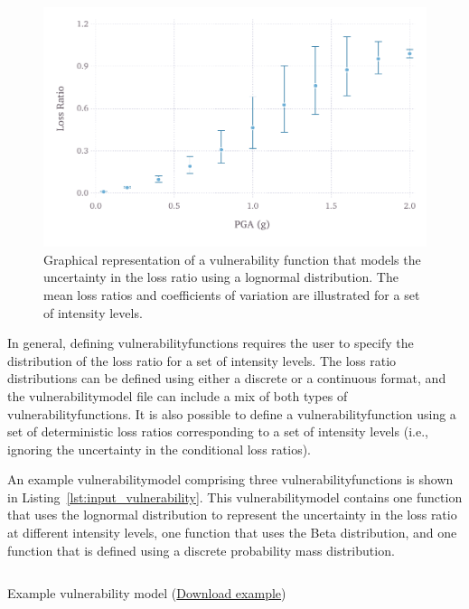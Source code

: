 \begin{figure}[ht]
\centering
\includegraphics[width=12cm]{figures/risk/vulnerability-nonzero-cov.pdf}
\caption{Graphical representation of a vulnerability function that models the uncertainty in the loss ratio using a lognormal distribution. The mean loss ratios and coefficients of variation are illustrated for a set of intensity levels.}
\label{fig:vulnerability-nonzero-cov}
\end{figure}

In general, defining \glspl{vulnerabilityfunction} requires the user to
specify the distribution of the loss ratio for a set of intensity levels. The
loss ratio distributions can be defined using either a discrete or a
continuous format, and the \gls{vulnerabilitymodel} file can include a mix of
both types of \glspl{vulnerabilityfunction}. It is also possible to define a
\gls{vulnerabilityfunction} using a set of deterministic loss ratios
corresponding to a set of intensity levels (i.e., ignoring the uncertainty in
the conditional loss ratios).

An example \gls{vulnerabilitymodel} comprising three
\glspl{vulnerabilityfunction} is shown in
Listing~\ref{lst:input_vulnerability}. This \gls{vulnerabilitymodel} contains
one function that uses the lognormal distribution to represent the uncertainty
in the loss ratio at different intensity levels, one function that uses the
Beta distribution, and one function that is defined using a discrete
probability mass distribution.

\begin{listing}[htbp]
  \inputminted[firstline=1,firstnumber=1,fontsize=\footnotesize,frame=single,linenos,bgcolor=lightgray]{xml}{oqum/risk/verbatim/input_vulnerability.xml}
  \caption{Example vulnerability model (\href{https://raw.githubusercontent.com/gem/oq-engine/master/doc/manual/oqum/risk/verbatim/input_vulnerability.xml}{Download example})}
  \label{lst:input_vulnerability}
\end{listing}


